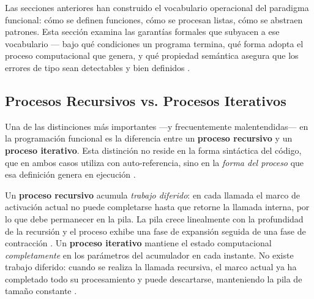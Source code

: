 Las secciones anteriores han construido el vocabulario operacional del paradigma funcional: cómo se definen funciones, cómo se procesan listas, cómo se abstraen patrones. Esta sección examina las garantías formales que subyacen a ese vocabulario — bajo qué condiciones un programa termina, qué forma adopta el proceso computacional que genera, y qué propiedad semántica asegura que los errores de tipo sean detectables y bien definidos \cite{SICP, PFPL}.

\subsection{Procesos Recursivos vs. Procesos Iterativos}
\label{subsec:4_5_1_recursion_vs_iteracion}

Una de las distinciones más importantes —y frecuentemente malentendidas— en la programación funcional es la diferencia entre un \textbf{proceso recursivo} y un \textbf{proceso iterativo}. Esta distinción no reside en la forma sintáctica del código, que en ambos casos utiliza  con auto-referencia, sino en la \textit{forma del proceso} que esa definición genera en ejecución \cite{SICP}.

Un \textbf{proceso recursivo} acumula \textit{trabajo diferido}: en cada llamada el marco de activación actual no puede completarse hasta que retorne la llamada interna, por lo que debe permanecer en la pila. La pila crece linealmente con la profundidad de la recursión y el proceso exhibe una fase de expansión seguida de una fase de contracción \cite{SICP}. Un \textbf{proceso iterativo} mantiene el estado computacional \textit{completamente} en los parámetros del acumulador en cada instante. No existe trabajo diferido: cuando se realiza la llamada recursiva, el marco actual ya ha completado todo su procesamiento y puede descartarse, manteniendo la pila de tamaño constante \cite{SICP, HtDP}.

